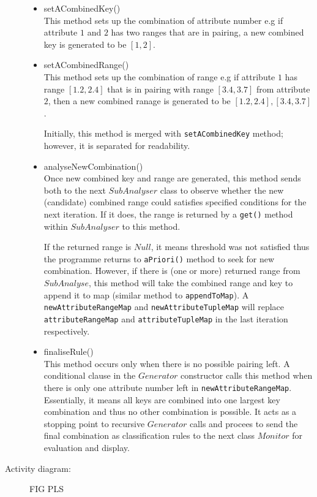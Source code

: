 \begin{description}
\begin{itemize}
	\item{setACombinedKey()} \\
	This method sets up the combination of attribute number e.g if attribute $1$ and $2$ has two ranges that are in pairing, a new combined key is generated to be $[1, 2]$.
	
	\item{setACombinedRange()} \\
	This method sets up the combination of range e.g if attribute $1$ has range $[1.2, 2.4]$ that is in pairing with range $[3.4,3.7]$ from attribute $2$, then a new combined ranage is generated to be ${[1.2, 2.4], [3.4, 3.7]}$.
	
	Initially, this method is merged with \texttt{setACombinedKey} method; however, it is separated for readability.
	
	\item{analyseNewCombination()} \\
	 Once new combined key and range are generated, this method sends both to the next $SubAnalyser$ class to observe whether the new (candidate) combined range could satisfies specified conditions for the next iteration. If it does, the range is returned by a \texttt{get()} method within $SubAnalyser$ to this method. 
	 
	 If the returned range is $Null$, it means threshold was not satisfied thus the programme returns to \texttt{aPriori()} method to seek for new combination. However, if there is (one or more) returned range from $SubAnalyse$, this method will take the combined range and key to append it to map (similar method to \texttt{appendToMap}). A \texttt{newAttributeRangeMap} and \texttt{newAttributeTupleMap} will replace \texttt{attributeRangeMap} and \texttt{attributeTupleMap} in the last iteration respectively.
	
	\item{finaliseRule()} \\
	This method occurs only when there is no possible pairing left. A conditional clause in the $Generator$ constructor calls this method when there is only one attribute number left in \texttt{newAttributeRangeMap}. Essentially, it means all keys are combined into one largest key combination and thus no other combination is possible. It acts as a stopping point to recursive $Generator$ calls and procees to send the final combination as classification rules to the next class $Monitor$ for evaluation and display.
	
\end{itemize}

\item[Activity diagram: ] 

FIG PLS
\end{description}

